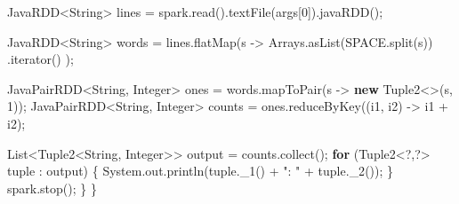 \documentclass[
]{article}
\newenvironment{Shaded}{}{}
\newcommand{\BuiltInTok}[1]{\textcolor[rgb]{0.00,0.50,0.00}{#1}}
\newcommand{\ControlFlowTok}[1]{\textcolor[rgb]{0.00,0.44,0.13}{\textbf{#1}}}
\newcommand{\DecValTok}[1]{\textcolor[rgb]{0.25,0.63,0.44}{#1}}
\newcommand{\FunctionTok}[1]{\textcolor[rgb]{0.02,0.16,0.49}{#1}}
\newcommand{\KeywordTok}[1]{\textcolor[rgb]{0.00,0.44,0.13}{\textbf{#1}}}
\newcommand{\NormalTok}[1]{#1}
\newcommand{\OperatorTok}[1]{\textcolor[rgb]{0.40,0.40,0.40}{#1}}
\newcommand{\StringTok}[1]{\textcolor[rgb]{0.25,0.44,0.63}{#1}}
\begin{document}
\begin{Shaded}
\begin{Highlighting}[]
\NormalTok{    JavaRDD}\OperatorTok{\textless{}}\BuiltInTok{String}\OperatorTok{\textgreater{}}\NormalTok{ lines }\OperatorTok{=}\NormalTok{ spark}\OperatorTok{.}\FunctionTok{read}\OperatorTok{().}\FunctionTok{textFile}\OperatorTok{(}\NormalTok{args}\OperatorTok{[}\DecValTok{0}\OperatorTok{]).}\FunctionTok{javaRDD}\OperatorTok{();}

\NormalTok{    JavaRDD}\OperatorTok{\textless{}}\BuiltInTok{String}\OperatorTok{\textgreater{}}\NormalTok{ words }\OperatorTok{=}\NormalTok{ lines}\OperatorTok{.}\FunctionTok{flatMap}\OperatorTok{(}\NormalTok{s }\OperatorTok{{-}\textgreater{}} \BuiltInTok{Arrays}\OperatorTok{.}\FunctionTok{asList}\OperatorTok{(}\NormalTok{SPACE}\OperatorTok{.}\FunctionTok{split}\OperatorTok{(}\NormalTok{s}\OperatorTok{))}
                                    \OperatorTok{.}\FunctionTok{iterator}\OperatorTok{()} \OperatorTok{);}

\NormalTok{    JavaPairRDD}\OperatorTok{\textless{}}\BuiltInTok{String}\OperatorTok{,} \BuiltInTok{Integer}\OperatorTok{\textgreater{}}\NormalTok{ ones }\OperatorTok{=}\NormalTok{ words}\OperatorTok{.}\FunctionTok{mapToPair}\OperatorTok{(}\NormalTok{s }\OperatorTok{{-}\textgreater{}} \KeywordTok{new}\NormalTok{ Tuple2}\OperatorTok{\textless{}\textgreater{}(}\NormalTok{s}\OperatorTok{,} \DecValTok{1}\OperatorTok{));}
\NormalTok{    JavaPairRDD}\OperatorTok{\textless{}}\BuiltInTok{String}\OperatorTok{,} \BuiltInTok{Integer}\OperatorTok{\textgreater{}}\NormalTok{ counts }\OperatorTok{=}\NormalTok{ ones}\OperatorTok{.}\FunctionTok{reduceByKey}\OperatorTok{((}\NormalTok{i1}\OperatorTok{,}\NormalTok{ i2}\OperatorTok{)} \OperatorTok{{-}\textgreater{}}\NormalTok{ i1 }\OperatorTok{+}\NormalTok{ i2}\OperatorTok{);}

    \BuiltInTok{List}\OperatorTok{\textless{}}\NormalTok{Tuple2}\OperatorTok{\textless{}}\BuiltInTok{String}\OperatorTok{,} \BuiltInTok{Integer}\OperatorTok{\textgreater{}\textgreater{}}\NormalTok{ output }\OperatorTok{=}\NormalTok{ counts}\OperatorTok{.}\FunctionTok{collect}\OperatorTok{();}
    \ControlFlowTok{for} \OperatorTok{(}\NormalTok{Tuple2}\OperatorTok{\textless{}?,?\textgreater{}}\NormalTok{ tuple }\OperatorTok{:}\NormalTok{ output}\OperatorTok{)} \OperatorTok{\{}
      \BuiltInTok{System}\OperatorTok{.}\FunctionTok{out}\OperatorTok{.}\FunctionTok{println}\OperatorTok{(}\NormalTok{tuple}\OperatorTok{.}\FunctionTok{\_1}\OperatorTok{()} \OperatorTok{+} \StringTok{": "} \OperatorTok{+}\NormalTok{ tuple}\OperatorTok{.}\FunctionTok{\_2}\OperatorTok{());}
    \OperatorTok{\}}
\NormalTok{    spark}\OperatorTok{.}\FunctionTok{stop}\OperatorTok{();}
  \OperatorTok{\}}
\OperatorTok{\}}
\end{Highlighting}
\end{Shaded}
\end{document}

